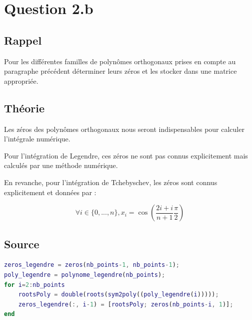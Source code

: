 \documentclass[a4paper,10pt]{report}
\begin{document}
\begin{center}
	
\end{center}

\section*{Question 2.b}

\subsection*{Rappel}

Pour les différentes familles de polynômes orthogonaux prises en compte au paragraphe précédent déterminer leurs zéros et les stocker dans une matrice appropriée.

\subsection*{Théorie}

Les zéros des polynômes orthogonaux nous seront indispensables pour calculer l’intégrale numérique. 

Pour l’intégration de Legendre, ces zéros ne sont pas connus explicitement mais calculés par une méthode numérique. 

En revanche, pour l’intégration de Tchebyschev, les zéros sont connus explicitement et données par :
    
\begin{equation*}
\forall{i} \in \{0, ..., n\}, x_i = \cos \left(\frac{2i + i}{n + 1}\frac{\pi}{2}\right)
\end{equation*}

\subsection*{Source}

\begin{lstlisting}[caption=Zeros de Legendre, language=Matlab]
zeros_legendre = zeros(nb_points-1, nb_points-1);
poly_legendre = polynome_legendre(nb_points);
for i=2:nb_points
    rootsPoly = double(roots(sym2poly((poly_legendre(i)))));
    zeros_legendre(:, i-1) = [rootsPoly; zeros(nb_points-i, 1)];
end
\end{lstlisting}
\end{document}
